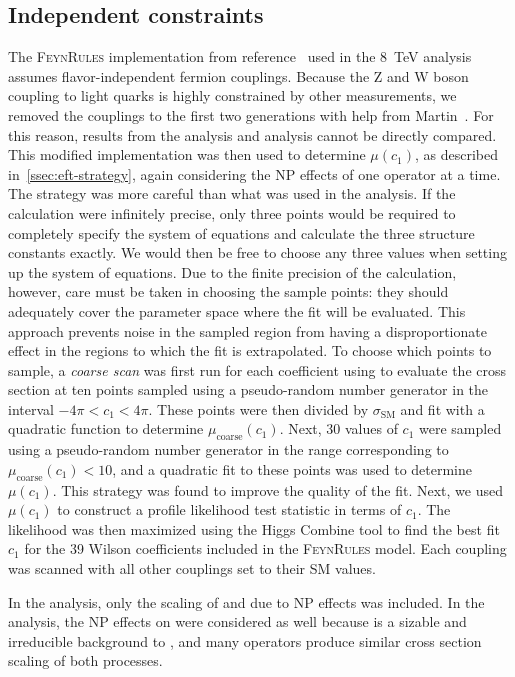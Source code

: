 \subsection{Independent constraints}
\label{ssec:13-1d-eft}
The \textsc{FeynRules} implementation from reference~\cite{Alloul2014} used in
the \SI{8}{TeV} analysis assumes flavor-independent fermion couplings. Because
the Z and W boson coupling to light quarks is highly constrained by other
measurements, we removed the couplings to the first two generations with help
from Martin~\cite{Martin2017}. For this reason, results from the \eightTeV
analysis and \thirteenTeV analysis cannot be directly compared. This modified
implementation was then used to determine $\mu(c_1)$, as described
in~\cref{ssec:eft-strategy}, again considering the NP effects of one operator at
a time. The strategy was more careful than what was used in the \eightTeV
analysis. If the \madgraph calculation were infinitely precise, only three
points would be required to completely specify the system of equations and
calculate the three structure constants exactly. We would then be free to choose
any three values when setting up the system of equations. Due to the finite
precision of the \madgraph calculation, however, care must be taken in choosing
the sample points: they should adequately cover the parameter space where the
fit will be evaluated. This approach prevents noise in the sampled region from
having a disproportionate effect in the regions to which the fit is
extrapolated. To choose which points to sample, a \emph{coarse scan} was first
run for each coefficient using \madgraph to evaluate the cross section at ten
points sampled using a pseudo-random number generator in the interval $-4\pi <
c_1 < 4\pi$. These points were then divided by $\sigma_\text{SM}$ and fit with a
quadratic function to determine $\mu_\text{coarse}(c_1)$. Next, 30 values of
$c_1$ were sampled using a pseudo-random number generator in the range
corresponding to $\mu_\text{coarse}(c_1) < 10$, and a quadratic fit to these
points was used to determine $\mu(c_1)$. This strategy was found to improve the
quality of the fit. Next, we used $\mu(c_1)$ to construct a profile likelihood
test statistic in terms of $c_1$. The likelihood was then maximized using the
Higgs Combine tool to find the best fit $c_1$ for the 39 Wilson coefficients
included in the \textsc{FeynRules} model. Each coupling was scanned with all
other couplings set to their SM values.

In the \eightTeV analysis, only the scaling of \ttW and \ttZ due to NP effects
was included. In the \thirteenTeV analysis, the NP effects on \ttH were
considered as well because \ttH is a sizable and irreducible background to \ttW,
and many operators produce similar cross section scaling of both processes.

